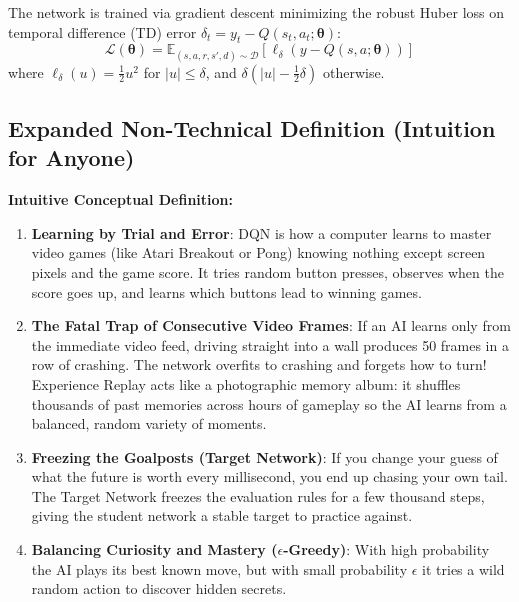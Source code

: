 \documentclass[11pt,a4paper]{article}
\theoremstyle{definition}
\begin{document}
The network is trained via gradient descent minimizing the robust Huber loss on temporal difference (TD) error $\delta_t = y_t - Q(s_t, a_t; \boldsymbol{\theta})$:
{\boldmath
\begin{equation}
\mathcal{L}(\boldsymbol{\theta}) = \mathbb{E}_{(s, a, r, s', d) \sim \mathcal{D}} \left[ \ell_\delta\left( y - Q(s, a; \boldsymbol{\theta}) \right) \right]
\end{equation}
}
where $\ell_\delta(u) = \frac{1}{2} u^2$ for $|u| \le \delta$, and $\delta (|u| - \frac{1}{2} \delta)$ otherwise.

\subsection{Expanded Non-Technical Definition (Intuition for Anyone)}
\textbf{Intuitive Conceptual Definition:}
\begin{enumerate}
    \item \textbf{Learning by Trial and Error}: DQN is how a computer learns to master video games (like Atari Breakout or Pong) knowing nothing except screen pixels and the game score. It tries random button presses, observes when the score goes up, and learns which buttons lead to winning games.
    \item \textbf{The Fatal Trap of Consecutive Video Frames}: If an AI learns only from the immediate video feed, driving straight into a wall produces 50 frames in a row of crashing. The network overfits to crashing and forgets how to turn! Experience Replay acts like a photographic memory album: it shuffles thousands of past memories across hours of gameplay so the AI learns from a balanced, random variety of moments.
    \item \textbf{Freezing the Goalposts (Target Network)}: If you change your guess of what the future is worth every millisecond, you end up chasing your own tail. The Target Network freezes the evaluation rules for a few thousand steps, giving the student network a stable target to practice against.
    \item \textbf{Balancing Curiosity and Mastery ($\epsilon$-Greedy)}: With high probability the AI plays its best known move, but with small probability $\epsilon$ it tries a wild random action to discover hidden secrets.
\end{enumerate}
\end{document}
